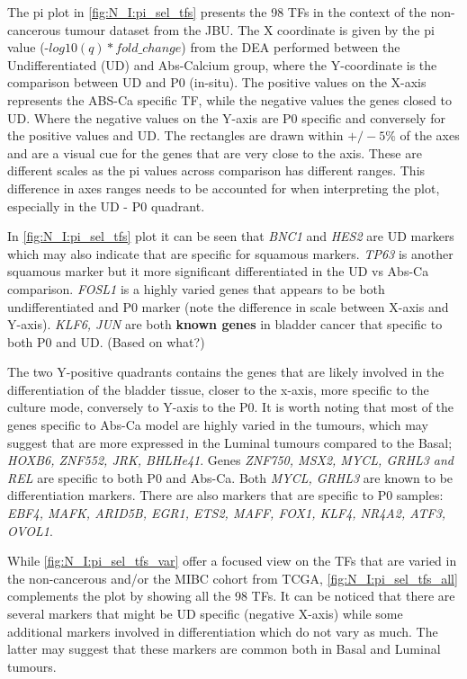 The pi plot in \cref{fig:N_I:pi_sel_tfs} presents the 98 TFs in the context of the non-cancerous tumour dataset from the JBU. The X coordinate is given by the pi value (-$log10(q)*fold\_change$) from the DEA performed between the Undifferentiated (UD) and Abs-Calcium group, where the Y-coordinate is the comparison between UD and P0 (in-situ). The positive values on the X-axis represents the ABS-Ca specific TF, while the negative values the genes closed to UD. Where the negative values on the Y-axis are P0 specific and conversely for the positive values and UD. The rectangles are drawn  within $+/-5\%$ of the axes and are a visual cue for the genes that are very close to the axis. These are different scales as the pi values across comparison has different ranges. This difference in axes ranges needs to be accounted for when interpreting the plot, especially in the UD - P0 quadrant. 

In \cref{fig:N_I:pi_sel_tfs} plot it can be seen that \textit{BNC1} and \textit{HES2} are UD markers which may also indicate that are specific for squamous markers. \textit{TP63} is another squamous marker \citet{Robertson2017-mg} but it more significant differentiated in the UD vs Abs-Ca comparison. \textit{FOSL1} is a highly varied genes that appears to be both undifferentiated and P0 marker (note the difference in scale between X-axis and Y-axis). \textit{KLF6, JUN} are both \textbf{known genes} in bladder cancer that specific to both P0 and UD. (Based on what?)

The two Y-positive quadrants contains the genes that are likely involved in the differentiation of the bladder tissue, closer to the x-axis, more specific to the culture mode, conversely to Y-axis to the P0. It is worth noting that most of the genes specific to Abs-Ca model are highly varied in the tumours, which may suggest that are more expressed in the Luminal tumours compared to the Basal; \textit{HOXB6, ZNF552, JRK, BHLHe41}. Genes \textit{ZNF750, MSX2, MYCL, GRHL3 and REL} are specific to both P0 and Abs-Ca. Both \textit{MYCL, GRHL3} are known to be differentiation markers. There are also markers that are specific to P0 samples: \textit{EBF4, MAFK, ARID5B, EGR1, ETS2, MAFF, FOX1, KLF4, NR4A2, ATF3, OVOL1}. 

While \cref{fig:N_I:pi_sel_tfs_var} offer a focused view on the TFs that are varied in the non-cancerous and/or the MIBC cohort from TCGA, \cref{fig:N_I:pi_sel_tfs_all} complements the plot by showing all the 98 TFs. It can be noticed that there are several markers that might be UD specific (negative X-axis) while some additional markers involved in differentiation which do not vary as much. The latter may suggest that these markers are common both in Basal and Luminal tumours. 

